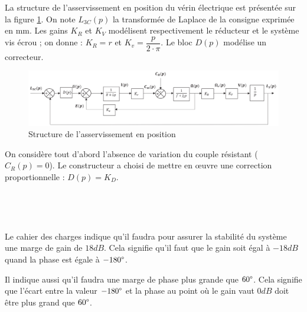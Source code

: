 La structure de l'asservissement en position du vérin électrique est présentée sur la figure \ref{fig19}. On note $L_{3C}(p)$ la transformée de Laplace de la consigne exprimée en mm. Les gains $K_R$ et $K_V$ modélisent respectivement le réducteur et le système vis écrou ; on donne : $K_R=r$ et $K_v=\dfrac{p}{2\cdot \pi}$. Le bloc $D(p)$ modélise un correcteur.

\begin{figure}[ht!]
\begin{center}
 \includegraphics[width=0.9\linewidth]{img/fig19}
\end{center}
\caption{\label{fig19} Structure de l'asservissement en position}
\end{figure}

On considère tout d'abord l'absence de variation du couple résistant ($C_R(p)=0$). Le constructeur a choisi de mettre en œuvre une correction proportionnelle : $D(p)=K_D$.


~\


~\

Le cahier des charges indique qu'il faudra pour assurer la stabilité du système une marge de gain de $18dB$. Cela signifie qu'il faut que le gain soit égal à $-18dB$ quand la phase est égale à $-180\degree$.

Il indique aussi qu'il faudra une marge de phase plus grande que $60\degree$. Cela signifie que l'écart entre la valeur $-180\degree$ et la phase au point où le gain vaut $0dB$ doit être plus grand que $60\degree$.


